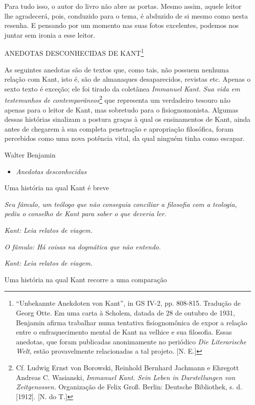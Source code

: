 Para tudo isso, o autor do livro não abre as portas. Mesmo assim, aquele
leitor lhe agradecerá, pois, conduzido para o tema, é abduzido de si
mesmo como nesta resenha. E pensando por um momento nas suas fotos
excelentes, podemos nos juntar sem ironia a esse leitor.

ANEDOTAS DESCONHECIDAS DE KANT\footnote{``Unbekannte Anekdoten von
  Kant'', in GS IV-2, pp. 808-815. Tradução de Georg Otte. Em uma carta
  à Scholem, datada de 28 de outubro de 1931, Benjamin afirma trabalhar
  numa tentativa fisiognomônica de expor a relação entre o
  enfraquecimento mental de Kant na velhice e sua filosofia. Essas
  anedotas, que foram publicadas anonimamente no periódico \emph{Die
  Literarische Welt}, estão provavelmente relacionadas a tal projeto.
  {[}N. E.{]}}

As seguintes anedotas são de textos que, como tais, não possuem nenhuma
relação com Kant, isto é, são de almanaques desaparecidos, revistas etc.
Apenas o sexto texto é exceção; ele foi tirado da coletânea
\emph{Immanuel Kant. Sua vida em testemunhos de
contemporâneos}\footnote{Cf. Ludwig Ernst von Borowski, Reinhold
  Bernhard Jachmann e Ehregott Andreas C. Wasianski, \emph{Immanuel
  Kant. Sein Leben in Darstellungen von Zeitgenossen.} Organização de
  Felix Groß. Berlin: Deutsche Bibliothek, s. d. {[}1912{]}. {[}N. do
  T.{]}} que representa um verdadeiro tesouro não apenas para o leitor
de Kant, mas sobretudo para o fisiognomonista. Algumas dessas histórias
sinalizam a postura graças à qual os ensinamentos de Kant, ainda antes
de chegarem à sua completa penetração e apropriação filosófica, foram
percebidos como uma nova potência vital, da qual ninguém tinha como
escapar.

Walter Benjamin

\begin{itemize}
\item
  \emph{Anedotas desconhecidas}
\end{itemize}

Uma história na qual Kant é breve

\emph{Seu fâmulo, um teólogo que não conseguia conciliar a filosofia com
a teologia, pediu o conselho de Kant para saber o que deveria ler.}

\emph{Kant: Leia relatos de viagem.}

\emph{O fâmulo: Há coisas na dogmática que não entendo.}

\emph{Kant: Leia relatos de viagem.}

Uma história na qual Kant recorre a uma comparação


